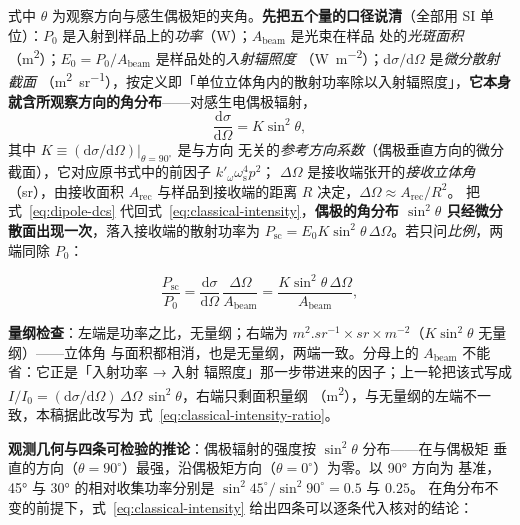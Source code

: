 式中 $\theta$ 为观察方向与感生偶极矩的夹角。\textbf{先把五个量的口径说清}（全部用 SI
单位）：$P_0$ 是入射到样品上的\emph{功率}（\unit{W}）；$A_{\mathrm{beam}}$ 是光束在样品
处的\emph{光斑面积}（\unit{m^2}）；$E_0=P_0/A_{\mathrm{beam}}$ 是样品处的\emph{入射辐照度}
（\unit{W.m^{-2}}）；$\mathrm{d}\sigma/\mathrm{d}\Omega$ 是\emph{微分散射截面}
（\unit{m^2.sr^{-1}}），按定义即「单位立体角内的散射功率除以入射辐照度」，\textbf{它本身
就含所观察方向的角分布}——对感生电偶极辐射，
\begin{equation}
\frac{\mathrm{d}\sigma}{\mathrm{d}\Omega}=K\sin^2\theta ,
\label{eq:dipole-dcs}
\end{equation}
其中 $K\equiv\left.(\mathrm{d}\sigma/\mathrm{d}\Omega)\right|_{\theta=90^\circ}$ 是与方向
无关的\emph{参考方向系数}（偶极垂直方向的微分截面），它对应原书式中的前因子
$k'_{\omega}\omega_{\mathrm{s}}^{4}p^{2}$；
$\Delta\Omega$ 是接收端张开的\emph{接收立体角}（\unit{sr}），由接收面积
$A_{\mathrm{rec}}$ 与样品到接收端的距离 $R$ 决定，$\Delta\Omega\approx A_{\mathrm{rec}}/R^2$。
把式~\eqref{eq:dipole-dcs} 代回式~\eqref{eq:classical-intensity}，\textbf{偶极的角分布
$\sin^2\theta$ 只经微分散面出现一次}，落入接收端的散射功率为
$P_{\mathrm{sc}}=E_0K\sin^2\theta\,\Delta\Omega$。若只问\emph{比例}，两端同除 $P_0$：

\begin{equation}
\frac{P_{\mathrm{sc}}}{P_0}
=\frac{\mathrm{d}\sigma}{\mathrm{d}\Omega}\,\frac{\Delta\Omega}{A_{\mathrm{beam}}}
=\frac{K\sin^2\theta\,\Delta\Omega}{A_{\mathrm{beam}}} ,
\label{eq:classical-intensity-ratio}
\end{equation}

\textbf{量纲检查}：左端是功率之比，无量纲；右端为
$\unit{m^2.sr^{-1}}\times\unit{sr}\times\unit{m^{-2}}$（$K\sin^2\theta$ 无量纲）——立体角
与面积都相消，也是无量纲，两端一致。分母上的 $A_{\mathrm{beam}}$ 不能省：它正是「入射功率 → 入射
辐照度」那一步带进来的因子；上一轮把该式写成
$I/I_0=(\mathrm{d}\sigma/\mathrm{d}\Omega)\,\Delta\Omega\,\sin^2\theta$，右端只剩面积量纲
（\unit{m^2}），与无量纲的左端不一致，本稿据此改写为
式~\eqref{eq:classical-intensity-ratio}。

\textbf{观测几何与四条可检验的推论}：偶极辐射的强度按 $\sin^2\theta$ 分布——在与偶极矩
垂直的方向（$\theta=90^\circ$）最强，沿偶极矩方向（$\theta=0^\circ$）为零。以 90° 方向为
基准，45° 与 30° 的相对收集功率分别是 $\sin^2 45^\circ/\sin^2 90^\circ=0.5$ 与 $0.25$。
在角分布不变的前提下，式~\eqref{eq:classical-intensity} 给出四条可以逐条代入核对的结论：

